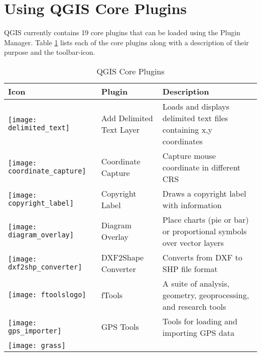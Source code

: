 
\section{Using QGIS Core Plugins}\label{sec:core_plugins}


QGIS currently contains 19 core plugins that can be loaded using the Plugin Manager.
Table \ref{tab:core_plugins} lists each of the core plugins along with a
description of their purpose and the toolbar-icon.

\begin{minipage}{\textwidth}
\begin{table}[H]
\centering
\caption{QGIS Core Plugins}\label{tab:core_plugins}\medskip
\small
 \begin{tabular}{|l|l|p{4in}|}
\hline \textbf{Icon} & \textbf{Plugin} & \textbf{Description}\\
\hline
\texttt{[image: delimited\_text]}
 & Add Delimited Text Layer \index{plugins!delimited text} & Loads and displays delimited text files containing x,y coordinates\\
\hline
\texttt{[image: coordinate\_capture]}
 & Coordinate Capture \index{plugins!coordinate capture}& Capture mouse coordinate in different CRS\\
\hline 
\texttt{[image: copyright\_label]}
 & Copyright Label \index{plugins!copyright}& Draws a copyright label with information\\
\hline
\texttt{[image: diagram\_overlay]}
 & Diagram Overlay \index{plugins!diagram}& Place charts (pie or bar) or proportional symbols over vector layers\\
\hline
\texttt{[image: dxf2shp\_converter]}
 & DXF2Shape Converter \index{plugins!DXF2Shape}& Converts from DXF to SHP file format\\
\hline
\texttt{[image: ftoolslogo]}
 & fTools \index{plugins!ftools}& A suite of analysis, geometry, geoprocessing, and research tools\\
\hline
\texttt{[image: gps\_importer]}
 & GPS Tools \index{plugins!gps}& Tools for loading and importing GPS data\\
\hline
\texttt{[image: grass]}

\end{tabular}
\end{table}
\end{minipage}
